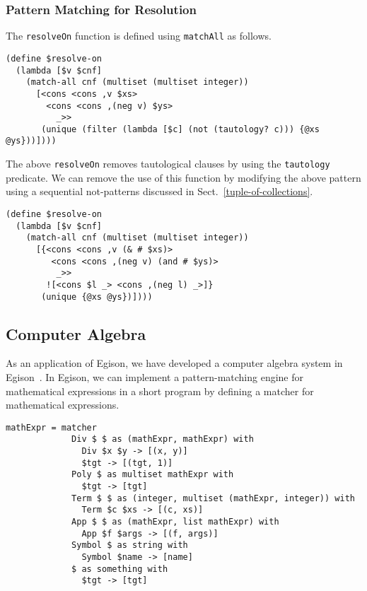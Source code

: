 \documentclass{article}
\begin{document}
\subsubsection{Pattern Matching for Resolution}

The \texttt{resolveOn} function is defined using \texttt{matchAll} as follows.

\begin{lstlisting}[language=egison]
(define $resolve-on
  (lambda [$v $cnf]
    (match-all cnf (multiset (multiset integer))
      [<cons <cons ,v $xs>
        <cons <cons ,(neg v) $ys>
          _>>
       (unique (filter (lambda [$c] (not (tautology? c))) {@xs @ys}))])))
\end{lstlisting}

\noindent The above \texttt{resolveOn} removes tautological clauses by using the \texttt{tautology} predicate.
We can remove the use of this function by modifying the above pattern using a sequential not-patterns discussed in Sect.~\ref{tuple-of-collections}.

\begin{lstlisting}[language=egison]
(define $resolve-on
  (lambda [$v $cnf]
    (match-all cnf (multiset (multiset integer))
      [{<cons <cons ,v (& # $xs)>
         <cons <cons ,(neg v) (and # $ys)>
          _>>
        ![<cons $l _> <cons ,(neg l) _>]}
       (unique {@xs @ys})])))
\end{lstlisting}

\subsection{Computer Algebra}\label{cas}

As an application of Egison, we have developed a computer algebra system in Egison~\cite{egisonMath}.
In Egison, we can implement a pattern-matching engine for mathematical expressions in a short program by defining a matcher for mathematical expressions.

\begin{lstlisting}[language=egison]
mathExpr = matcher
             Div $ $ as (mathExpr, mathExpr) with
               Div $x $y -> [(x, y)]
               $tgt -> [(tgt, 1)]
             Poly $ as multiset mathExpr with
               $tgt -> [tgt]
             Term $ $ as (integer, multiset (mathExpr, integer)) with
               Term $c $xs -> [(c, xs)]
             App $ $ as (mathExpr, list mathExpr) with
               App $f $args -> [(f, args)]
             Symbol $ as string with
               Symbol $name -> [name]
             $ as something with
               $tgt -> [tgt]
\end{lstlisting}
\end{document}
